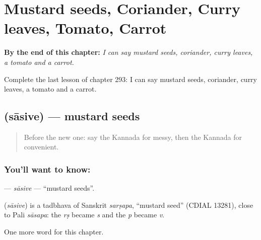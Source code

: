 
\chapter{Mustard seeds, Coriander, Curry leaves, Tomato, Carrot}
\label{ch:ka-mustard-seeds-coriander-curry-leaves-tomato-carrot}

\begin{chapteropening}
\textbf{By the end of this chapter:} \emph{I can say mustard seeds, coriander, curry leaves, a tomato and a carrot.}

Complete the last lesson of chapter 293: I can say mustard seeds, coriander, curry leaves, a tomato and a carrot.
\end{chapteropening}

\section[\texorpdfstring{\kn{ಸಾಸಿವೆ} (sāsive)}{ಸಾಸಿವೆ (sāsive)}]{ (sāsive) — mustard seeds}

\label{lesson:KA-C293-sasive}



\begin{quote}
Before the new one: say the Kannada for messy, then the Kannada for convenient.
\end{quote}

\subsection*{You'll want to know: }
\textbf{} — \emph{sāsive} — \textquotedblleft{}mustard seeds\textquotedblright{}.

\begin{cousinweb}
\textbf{} (\emph{sāsive}) is a tadbhava of Sanskrit \emph{sarṣapa}, \textquotedblleft{}mustard seed\textquotedblright{} (CDIAL 13281), close to Pali \emph{sāsapa}: the \emph{rṣ} became \emph{s} and the \emph{p} became \emph{v}.
\end{cousinweb}

\begin{grammarlens}[title={What you've built}]
One more word for this chapter.
\end{grammarlens}


